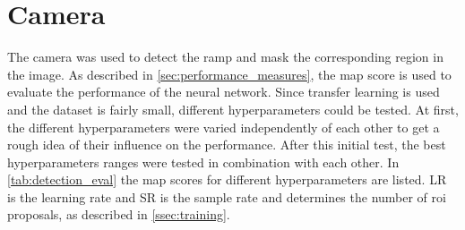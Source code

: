 \section{Camera}
\label{sec:eval_camera}
The camera was used to detect the ramp and mask the corresponding region in the image.
As described in \cref{sec:performance_measures}, the \gls{map} score is used to evaluate the performance of the neural network.
Since transfer learning is used and the dataset is fairly small, different hyperparameters could be tested.
At first, the different hyperparameters were varied independently of each other to get a rough idea of their influence on the performance.
After this initial test, the best hyperparameters ranges were tested in combination with each other.
In \cref{tab:detection_eval} the \gls{map} scores for different hyperparameters are listed.
LR is the learning rate and SR is the sample rate and determines the number of \gls{roi} proposals, as described in \cref{ssec:training}.\par
